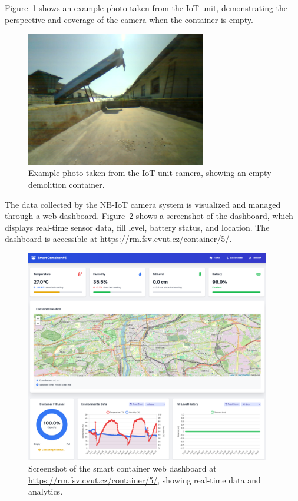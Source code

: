 \documentclass[11pt,a4paper]{article}
\begin{document}
Figure~\ref{fig:container-empty} shows an example photo taken from the IoT unit, demonstrating the perspective and coverage of the camera when the container is empty.

\begin{figure}[h]
    \centering
    \includegraphics[width=0.7\textwidth]{tex_photos/container_empty.jpg}
    \caption{Example photo taken from the IoT unit camera, showing an empty demolition container.}
    \label{fig:container-empty}
\end{figure}

The data collected by the NB-IoT camera system is visualized and managed through a web dashboard. Figure~\ref{fig:website-dashboard} shows a screenshot of the dashboard, which displays real-time sensor data, fill level, battery status, and location. The dashboard is accessible at \url{https://rm.fsv.cvut.cz/container/5/}.

\begin{figure}[h]
    \centering
    \includegraphics[width=0.95\textwidth]{tex_photos/website_container_5_1}
    \caption{Screenshot of the smart container web dashboard at \url{https://rm.fsv.cvut.cz/container/5/}, showing real-time data and analytics.}
    \label{fig:website-dashboard}
\end{figure}
\end{document}
